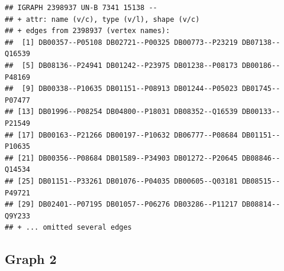 \documentclass[
]{article}
\begin{document}
\begin{verbatim}
## IGRAPH 2398937 UN-B 7341 15138 -- 
## + attr: name (v/c), type (v/l), shape (v/c)
## + edges from 2398937 (vertex names):
##  [1] DB00357--P05108 DB02721--P00325 DB00773--P23219 DB07138--Q16539
##  [5] DB08136--P24941 DB01242--P23975 DB01238--P08173 DB00186--P48169
##  [9] DB00338--P10635 DB01151--P08913 DB01244--P05023 DB01745--P07477
## [13] DB01996--P08254 DB04800--P18031 DB08352--Q16539 DB00133--P21549
## [17] DB00163--P21266 DB00197--P10632 DB06777--P08684 DB01151--P10635
## [21] DB00356--P08684 DB01589--P34903 DB01272--P20645 DB08846--Q14534
## [25] DB01151--P33261 DB01076--P04035 DB00605--Q03181 DB08515--P49721
## [29] DB02401--P07195 DB01057--P06276 DB03286--P11217 DB08814--Q9Y233
## + ... omitted several edges
\end{verbatim}

\subsection{Graph 2}\label{graph-2}
\end{document}
